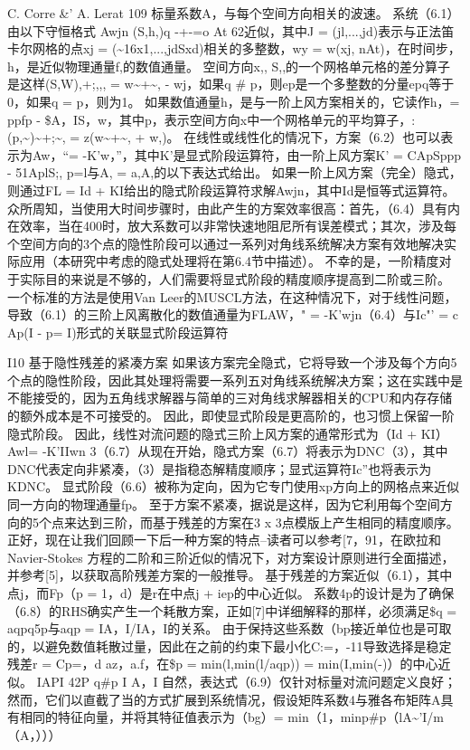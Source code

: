 \documentclass[UTF8,11pt,a4paper,openany,fontset=fandol]{ctexbook}
\begin{document}
C. Corre \&' A. Lerat 109 标量系数A，与每个空间方向相关的波速。 系统（6.1）由以下守恒格式 Awjn (S,h,)q -+-=o At 62近似，其中J = (jl,...,jd)表示与正法笛卡尔网格的点xj = (\textasciitilde{}16x1,...,jdSxd)相关的多整数，wy = w(xj, nAt)，在时间步，h，是近似物理通量f,的数值通量。 空间方向x,, S,,的一个网格单元格的差分算子是这样(S,W),+;,,, = w\textasciitilde{}+\textasciitilde{}, - wj，如果q \# p，则ep是一个多整数的分量epq等于0，如果q = p，则为1。 如果数值通量h，是与一阶上风方案相关的，它读作h，= ppfp - \$A，IS，w，其中p，表示空间方向x中一个网格单元的平均算子，: (p,\textasciitilde{})\textasciitilde{}+;\textasciitilde{}, = z(w\textasciitilde{}+\textasciitilde{}, + w,)。 在线性或线性化的情况下，方案（6.2）也可以表示为Aw，“= -K'w，”，其中K'是显式阶段运算符，由一阶上风方案K' = CApSppp - 51AplS;, p=l与A, = a,A,的以下表达式给出。 如果一阶上风方案（完全）隐式，则通过FL = Id + KI给出的隐式阶段运算符求解Awjn，其中Id是恒等式运算符。 众所周知，当使用大时间步骤时，由此产生的方案效率很高：首先，（6.4）具有内在效率，当在400时，放大系数可以非常快速地阻尼所有误差模式；其次，涉及每个空间方向的3个点的隐性阶段可以通过一系列对角线系统解决方案有效地解决实际应用（本研究中考虑的隐式处理将在第6.4节中描述）。 不幸的是，一阶精度对于实际目的来说是不够的，人们需要将显式阶段的精度顺序提高到二阶或三阶。 一个标准的方法是使用Van Leer的MUSCL方法，在这种情况下，对于线性问题，导致（6.1）的三阶上风离散化的数值通量为FLAW，" = -K'wjn（6.4）与Ic"' = c Ap(I - p= I)形式的关联显式阶段运算符

I10 基于隐性残差的紧凑方案 如果该方案完全隐式，它将导致一个涉及每个方向5个点的隐性阶段，因此其处理将需要一系列五对角线系统解决方案；这在实践中是不能接受的，因为五角线求解器与简单的三对角线求解器相关的CPU和内存存储的额外成本是不可接受的。 因此，即使显式阶段是更高阶的，也习惯上保留一阶隐式阶段。 因此，线性对流问题的隐式三阶上风方案的通常形式为（Id + KI）Awl= -K'IIwn 3（6.7）从现在开始，隐式方案（6.7）将表示为DNC（3），其中DNC代表定向非紧凑，（3）是指稳态解精度顺序；显式运算符Ic”也将表示为KDNC。 显式阶段（6.6）被称为定向，因为它专门使用xp方向上的网格点来近似同一方向的物理通量fp。 至于方案不紧凑，据说是这样，因为它利用每个空间方向的5个点来达到三阶，而基于残差的方案在3 x 3点模版上产生相同的精度顺序。 正好，现在让我们回顾一下后一种方案的特点--读者可以参考[7，91，在欧拉和Navier-Stokes 方程的二阶和三阶近似的情况下，对方案设计原则进行全面描述，并参考[5]，以获取高阶残差方案的一般推导。 基于残差的方案近似（6.1），其中点j，而Fp（p = 1，d）是r在中点j + iep的中心近似。 系数4p的设计是为了确保（6.8）的RHS确实产生一个耗散方案，正如[7]中详细解释的那样，必须满足\$q = aqpq5p与aqp = IA，I/IA，I的关系。 由于保持这些系数（bp接近单位也是可取的，以避免数值耗散过量，因此在之前的约束下最小化C:=，-11导致选择是稳定残差r = Cp=，d az，a.f，在\$p = min(l,min(l/aqp)) = min(I,min(-)）的中心近似。 IAPI 42P q\#p I A，I 自然，表达式（6.9）仅针对标量对流问题定义良好；然而，它们以直截了当的方式扩展到系统情况，假设矩阵系数4与雅各布矩阵A具有相同的特征向量，并将其特征值表示为（bg）= min（1，minp\#p（lA\textasciitilde{}'I/m（A，）））
\end{document}
